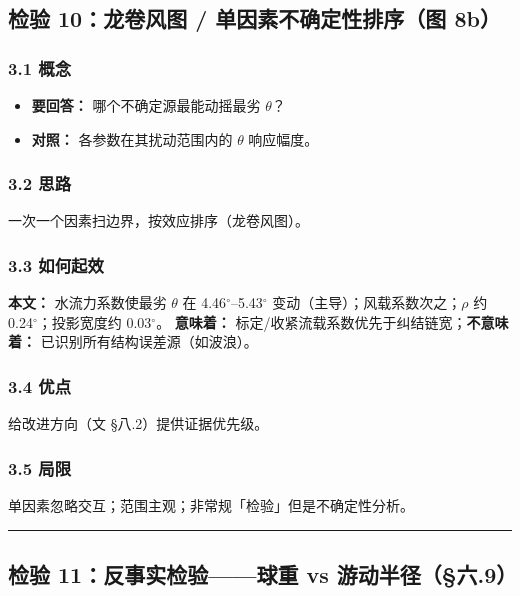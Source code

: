 \documentclass[UTF8,a4paper,zihao=-4]{ctexart}
\begin{document}
\subsection{\texorpdfstring{检验 10：龙卷风图 / 单因素不确定性排序（图 8b）}{检验 10：龙卷风图 / 单因素不确定性排序（图 8b）}}

\subsubsection{\texorpdfstring{3.1 概念}{3.1 概念}}
\begin{itemize}[leftmargin=1.5em]
\item \textbf{要回答：} 哪个不确定源最能动摇最劣 \(\theta\)？
\item \textbf{对照：} 各参数在其扰动范围内的 \(\theta\) 响应幅度。
\end{itemize}

\subsubsection{\texorpdfstring{3.2 思路}{3.2 思路}}
一次一个因素扫边界，按效应排序（龙卷风图）。

\subsubsection{\texorpdfstring{3.3 如何起效}{3.3 如何起效}}
\textbf{本文：} 水流力系数使最劣 \(\theta\) 在 4.46$^\circ$--5.43$^\circ$ 变动（主导）；风载系数次之；\(\rho\) 约 0.24$^\circ$；投影宽度约 0.03$^\circ$。  
\textbf{意味着：} 标定/收紧流载系数优先于纠结链宽；\textbf{不意味着：} 已识别所有结构误差源（如波浪）。

\subsubsection{\texorpdfstring{3.4 优点}{3.4 优点}}
给改进方向（文 §八.2）提供证据优先级。

\subsubsection{\texorpdfstring{3.5 局限}{3.5 局限}}
单因素忽略交互；范围主观；非常规「检验」但是不确定性分析。

\vspace{0.4em}\hrule\vspace{0.4em}

\subsection{\texorpdfstring{检验 11：反事实检验------球重 vs 游动半径（§六.9）}{检验 11：反事实检验------球重 vs 游动半径（§六.9）}}
\end{document}
